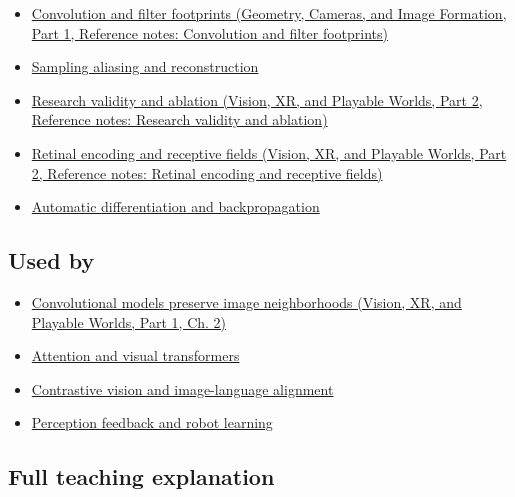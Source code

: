 \hypertarget{appendix-47c51ea026fb-prerequisites}{}

\begin{itemize}
\tightlist
\item
  \href{../03-Geometry-Cameras-and-Image-Formation-P01/main.pdf\#appendix-d5b3c692d9f0}{Convolution and filter footprints (Geometry, Cameras, and Image Formation, Part 1, Reference notes: Convolution and filter footprints)}
\item
  \hyperref[appendix-6a7869dd79a6]{Sampling aliasing and reconstruction}
\item
  \href{../07-Vision-XR-and-Playable-Worlds-P02/main.pdf\#appendix-65788587ef78}{Research validity and ablation (Vision, XR, and Playable Worlds, Part 2, Reference notes: Research validity and ablation)}
\item
  \href{../07-Vision-XR-and-Playable-Worlds-P02/main.pdf\#appendix-7281c15ac44a}{Retinal encoding and receptive fields (Vision, XR, and Playable Worlds, Part 2, Reference notes: Retinal encoding and receptive fields)}
\item
  \hyperref[appendix-40df0855b4a7]{Automatic differentiation and backpropagation}
\end{itemize}

\subsection{Used by}\label{appendix-47c51ea026fb-used-by}

\hypertarget{appendix-47c51ea026fb-used-by}{}

\begin{itemize}
\tightlist
\item
  \href{../07-Vision-XR-and-Playable-Worlds-P01/main.pdf\#04-visual-computing-ii-ch031-convolutional-models-preserve-image-neighborhoods}{Convolutional models preserve image neighborhoods (Vision, XR, and Playable Worlds, Part 1, Ch. 2)}
\item
  \hyperref[appendix-a9d5dfdd164a]{Attention and visual transformers}
\item
  \hyperref[appendix-772f1fd96148]{Contrastive vision and image-language alignment}
\item
  \hyperref[appendix-b0c42da325f1]{Perception feedback and robot learning}
\end{itemize}

\subsection{Full teaching explanation}\label{appendix-47c51ea026fb-full-teaching-explanation}

